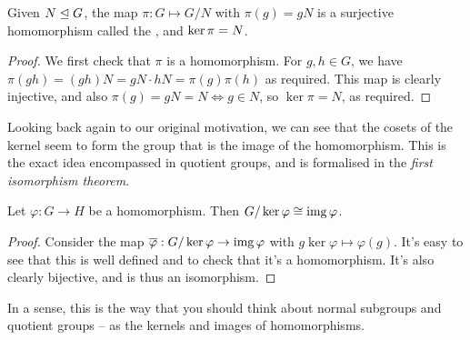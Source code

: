\documentclass[11pt]{amsart}
\newcommand{\op}{\overline{\varphi}}
\begin{document}
\begin{theorem*}
	Given $N \trianglelefteq G$, the map $\pi: G \mapsto G/N$ with $\pi(g) = gN$ is a surjective homomorphism called the , and $\operatorname{ker} \pi = N$. 
\end{theorem*}
\begin{proof}
We first check that $\pi$ is a homomorphism. For $g, h \in G$, we have $\pi(gh) = (gh)N = gN \cdot hN = \pi(g) \pi(h)$ as required. This map is clearly injective, and also $\pi(g) = gN = N \iff g \in N$, so $\ker \pi = N$, as required.
\end{proof}


Looking back again to our original motivation, we can see that the cosets of the kernel seem to form the group that is the image of the homomorphism. This is the exact idea encompassed in quotient groups, and is formalised in the \emph{first isomorphism theorem}.

\begin{theorem*}
	Let $\varphi:G \rightarrow H$ be a homomorphism. Then $G/\operatorname{ker} \varphi \cong \operatorname{img} \varphi$.
\end{theorem*}
\begin{proof}
	Consider the map $\op: G/\ker\varphi \rightarrow \image \varphi$ with $g\ker\varphi \mapsto \varphi(g)$. It's easy to see that this is well defined and to check that it's a homomorphism. It's also clearly bijective, and is thus an isomorphism.
\end{proof}

In a sense, this is the way that you should think about normal subgroups and quotient groups -- as the kernels and images of homomorphisms.
\end{document}
